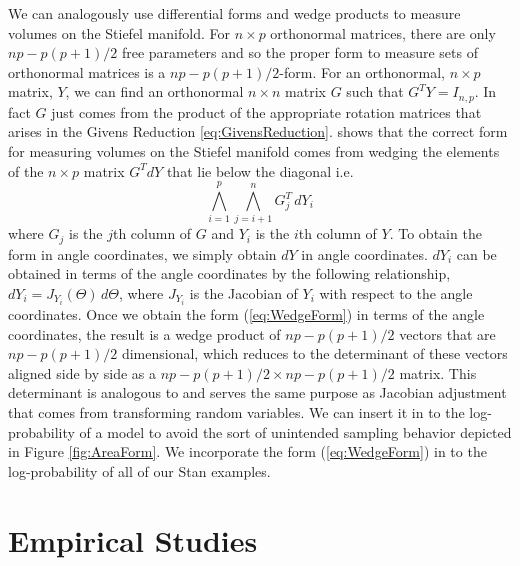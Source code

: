 \documentclass{article}
\begin{document}
We can analogously use differential forms and wedge products to measure volumes on the Stiefel manifold. For $n \times p$ orthonormal matrices, there are only $np-p(p+1)/2$ free parameters and so the proper form to measure sets of orthonormal matrices is a $np-p(p+1)/2$-form. For an orthonormal, $n \times p$ matrix, $Y$, we can find an orthonormal $n \times n$ matrix $G$ such that $G^T Y = I_{n,p}$. In fact $G$ just comes from the product of the appropriate rotation matrices that arises in the Givens Reduction \ref{eq:GivensReduction}. \citet{muirhead2009aspects} shows that the correct form for measuring volumes on the Stiefel manifold comes from wedging the elements of the $n \times p$ matrix $G^T dY$ that lie below the diagonal i.e.
\begin{equation}
\label{eq:WedgeForm}
\bigwedge_{i=1}^p \bigwedge_{j=i+1}^n G_j^T\, dY_i
\end{equation}
where $G_j$ is the $j$th column of $G$ and $Y_i$ is the $i$th column of $Y$. To obtain the form in angle coordinates, we simply obtain $dY$ in angle coordinates. $dY_i$ can be obtained in terms of the angle coordinates by the following relationship, $dY_i = J_{Y_i}(\Theta)\, d\Theta$, where $J_{Y_i}$ is the Jacobian of $Y_i$ with respect to the angle coordinates. Once we obtain the form (\ref{eq:WedgeForm}) in terms of the angle coordinates, the result is a wedge product of $np-p(p+1)/2$ vectors that are $np-p(p+1)/2$ dimensional, which reduces to the determinant of these vectors aligned side by side as a $np-p(p+1)/2 \times np-p(p+1)/2$ matrix. This determinant is analogous to and serves the same purpose as Jacobian adjustment that comes from transforming random variables. We can insert it in to the log-probability of a model to avoid the sort of unintended sampling behavior depicted in Figure \ref{fig:AreaForm}. We incorporate the form (\ref{eq:WedgeForm}) in to the log-probability of all of our Stan examples.

\section{Empirical Studies} \label{examples}

\end{document}
